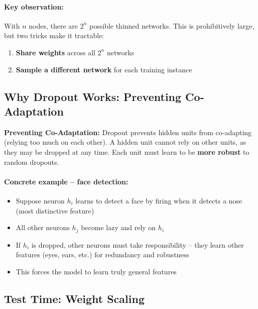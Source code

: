 \documentclass[12pt,a4paper]{article}
\begin{document}
\paragraph{Key observation:} With $n$ nodes, there are $2^n$ possible thinned networks. This is prohibitively large, but two tricks make it tractable:
\begin{enumerate}
  \item \textbf{Share weights} across all $2^n$ networks
  \item \textbf{Sample a different network} for each training instance
\end{enumerate}

\subsection{Why Dropout Works: Preventing Co-Adaptation}

\begin{keybox}
\textbf{Preventing Co-Adaptation:} Dropout prevents hidden units from co-adapting (relying too much on each other). A hidden unit cannot rely on other units, as they may be dropped at any time. Each unit must learn to be \textbf{more robust} to random dropouts.
\end{keybox}

\paragraph{Concrete example -- face detection:}
\begin{itemize}
  \item Suppose neuron $h_i$ learns to detect a face by firing when it detects a nose (most distinctive feature)
  \item All other neurons $h_j$ become lazy and rely on $h_i$
  \item If $h_i$ is dropped, other neurons must take responsibility -- they learn other features (eyes, ears, etc.) for redundancy and robustness
  \item This forces the model to learn truly general features
\end{itemize}

\subsection{Test Time: Weight Scaling}
\end{document}
